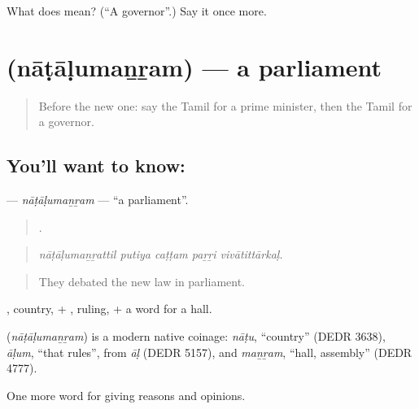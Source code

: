 \begin{tcolorbox}[breakable,colback=teal!4,colframe=teal!35!black,title={Before you move on}]
What does  mean? (\textquotedblleft{}A governor\textquotedblright{}.) Say it once more.
\end{tcolorbox}
\section[\texorpdfstring{\ta{நாடாளுமன்றம்} (nāṭāḷumaṉṟam)}{நாடாளுமன்றம் (nāṭāḷumaṉṟam)}]{ (nāṭāḷumaṉṟam) — a parliament}

\label{lesson:TA-C373-natalumanram}



\begin{quote}
Before the new one: say the Tamil for a prime minister, then the Tamil for a governor.
\end{quote}

\subsection*{You'll want to know: }
\textbf{} — \emph{nāṭāḷumaṉṟam} — \textquotedblleft{}a parliament\textquotedblright{}.

\begin{quote}
    .
\end{quote}

\begin{quote}
\emph{nāṭāḷumaṉṟattil putiya caṭṭam paṟṟi vivātittārkaḷ.}
\end{quote}

\begin{quote}
They debated the new law in parliament.
\end{quote}

, country, + , ruling, + a word for a hall.

\begin{cousinweb}
\textbf{} (\emph{nāṭāḷumaṉṟam}) is a modern native coinage: \emph{nāṭu}, \textquotedblleft{}country\textquotedblright{} (DEDR 3638), \emph{āḷum}, \textquotedblleft{}that rules\textquotedblright{}, from \emph{āḷ} (DEDR 5157), and \emph{maṉṟam}, \textquotedblleft{}hall, assembly\textquotedblright{} (DEDR 4777).
\end{cousinweb}

\begin{grammarlens}[title={What you've built}]
One more word for giving reasons and opinions.
\end{grammarlens}

